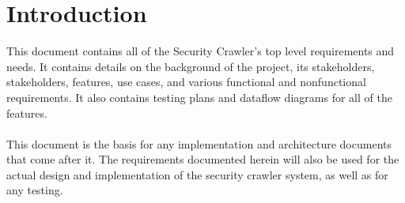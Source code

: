 \section{Introduction}
This document contains all of the Security Crawler's top level requirements and needs.  It contains details on the background of the project, its stakeholders, stakeholders, features, use cases, and various functional and nonfunctional requirements.  It also contains testing plans and dataflow diagrams for all of the features.\\\\
This document is the basis for any implementation and architecture documents that come after it.  The requirements documented herein will also be used for the actual design and implementation of the security crawler system, as well as for any testing.
